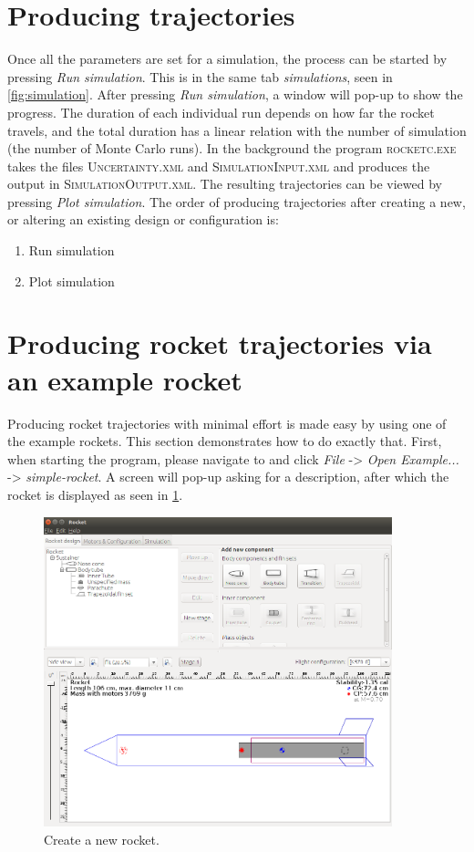 \documentclass[11pt, a4paper]{article}
\newcommand{\loc}[1]{{\footnotesize \textsc{#1}}}
\begin{document}
\section{Producing trajectories} \label{sec:export}

Once all the parameters are set for a simulation, the process can be started by pressing \emph{Run simulation}. This is in the same tab \emph{simulations}, seen in \cref{fig:simulation}. After pressing \emph{Run simulation}, a window will pop-up to show the progress. The duration of each individual run depends on how far the rocket travels, and the total duration has a linear relation with the number of simulation (the number of Monte Carlo runs). In the background the program \loc{rocketc.exe} takes the files \loc{Uncertainty.xml} and \loc{SimulationInput.xml} and produces the output in \loc{SimulationOutput.xml}. The resulting trajectories can be viewed by pressing \emph{Plot simulation}. The order of producing trajectories after creating a new, or altering an existing design or configuration is:
\begin{enumerate}
\item Run simulation
\item Plot simulation
\end{enumerate}

\section{Producing rocket trajectories via an example rocket}

Producing rocket trajectories with minimal effort is made easy by using one of the example rockets. This section demonstrates how to do exactly that. First, when starting the program, please navigate to and click
\emph{File} \textsc{->} \emph{Open Example...} \textsc{->} \emph{simple-rocket}. A screen will pop-up asking for a description, after which the rocket is displayed as seen in \cref{fig:crs_1}.

\begin{figure}
  \centering
    \includegraphics[width=0.9\textwidth]{crs_1_new_rocket.png}
  \caption{Create a new rocket.}
  \label{fig:crs_1}
\end{figure}
\end{document}
